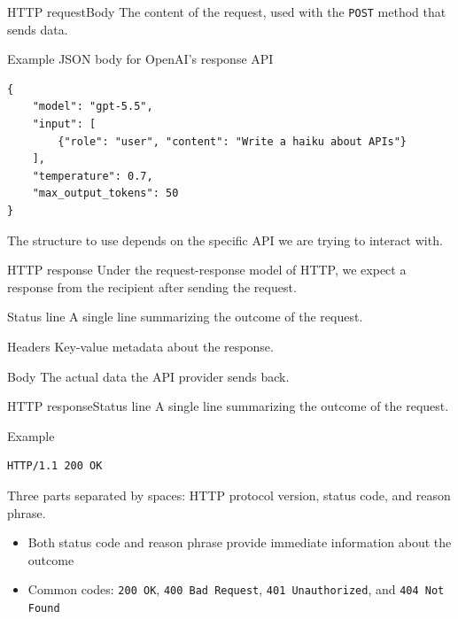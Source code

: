 \documentclass[aspectratio=169]{beamer}
\begin{document}
\begin{frame}[fragile]{HTTP request}{Body}
    The content of the request, used with the \texttt{POST} method that sends data.

    \begin{block}{Example JSON body for OpenAI's response API}
        \begin{verbatim}
{
    "model": "gpt-5.5",
    "input": [
        {"role": "user", "content": "Write a haiku about APIs"}
    ],
    "temperature": 0.7,
    "max_output_tokens": 50
}
        \end{verbatim}
    \end{block}

    The structure to use depends on the specific API we are trying to interact with.
\note{
}
\end{frame}


\begin{frame}{HTTP response}
    Under the request-response model of HTTP, we expect a response from the recipient after sending the request.

    \begin{block}{Status line}
        A single line summarizing the outcome of the request.
    \end{block}

    \begin{block}{Headers}
        Key-value metadata about the response.
    \end{block}

    \begin{block}{Body}
        The actual data the API provider sends back.
    \end{block}
\note{
}
\end{frame}


\begin{frame}[fragile]{HTTP response}{Status line}
    A single line summarizing the outcome of the request.

    \begin{block}{Example}
        \begin{verbatim}
HTTP/1.1 200 OK
        \end{verbatim}
    \end{block}

    Three parts separated by spaces: HTTP protocol version, status code, and reason phrase.
    \begin{itemize}
        \item Both status code and reason phrase provide immediate information about the outcome
        \item Common codes: \texttt{200 OK}, \texttt{400 Bad Request}, \texttt{401 Unauthorized}, and \texttt{404 Not Found}
    \end{itemize}
\end{frame}
\end{document}

